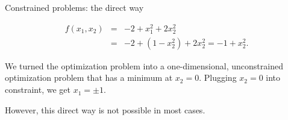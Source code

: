 \documentclass[11pt,compress,t,notes=noshow, xcolor=table]{beamer}
\begin{document}
\begin{vbframe}{Constrained problems: the direct way}
 \vspace*{-0.5cm}

 \begin{footnotesize}
 \begin{eqnarray*}
 f(x_1, x_2) &=& - 2 + x_1^2 + 2 x_2^2 \\
 &=& -2 + (1 - x_2^2) + 2 x_2^2 = - 1 + x_2^2.
 \end{eqnarray*}
 \end{footnotesize}

 \vspace*{-0.3cm}

 We turned the optimization problem into a one-dimensional, unconstrained optimization problem
 that has a minimum at $x_2 = 0$. Plugging $x_2 = 0$ into constraint, we get $x_1 = \pm 1$.

 \vspace*{0.2cm}

 However, this direct way is not possible in most cases.

\end{vbframe}
\end{document}
